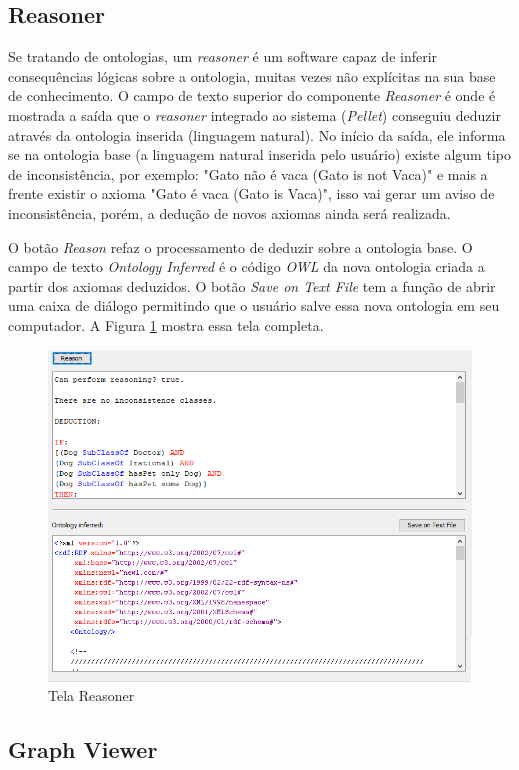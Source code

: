 \documentclass{bcc}
\begin{document}
\subsection{Reasoner}

Se tratando de ontologias, um \textit{reasoner} é um software capaz de inferir consequências lógicas sobre a ontologia, muitas vezes não explícitas na sua base de conhecimento. O campo de texto superior do componente \textit{Reasoner} é onde é mostrada a saída que o \textit{reasoner} integrado ao sistema (\textit{Pellet}) conseguiu deduzir através da ontologia inserida (linguagem natural). No início da saída, ele informa se na ontologia base (a linguagem natural inserida pelo usuário) existe algum tipo de inconsistência, por exemplo: "Gato não é vaca (Gato is not Vaca)" e mais a frente existir o axioma "Gato é vaca (Gato is Vaca)", isso vai gerar um aviso de inconsistência, porém, a dedução de novos axiomas ainda será realizada.

O botão \textit{Reason} refaz o processamento de deduzir sobre a ontologia base. O campo de texto \textit{Ontology Inferred} é o código \textit{OWL} da nova ontologia criada a partir dos axiomas deduzidos. O botão \textit{Save on Text File} tem a função de abrir uma caixa de diálogo permitindo que o usuário salve essa nova ontologia em seu computador. A Figura \ref{fig:telaReasoner} mostra essa tela completa.

\begin{figure}[H]
\centering
\includegraphics[width=.7\textwidth]{Figuras/tela_reasoner.png}
\caption{Tela Reasoner}
\label{fig:telaReasoner}
\end{figure}

\subsection{Graph Viewer}
\end{document}
